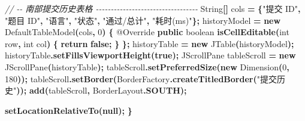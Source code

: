 \documentclass[
  11pt,
]{ctexart}
\newenvironment{Shaded}{\begin{snugshade}}{\end{snugshade}}
\newcommand{\AttributeTok}[1]{\textcolor[rgb]{0.13,0.29,0.53}{#1}}
\newcommand{\BuiltInTok}[1]{#1}
\newcommand{\CommentTok}[1]{\textcolor[rgb]{0.56,0.35,0.01}{\textit{#1}}}
\newcommand{\ControlFlowTok}[1]{\textcolor[rgb]{0.13,0.29,0.53}{\textbf{#1}}}
\newcommand{\DataTypeTok}[1]{\textcolor[rgb]{0.13,0.29,0.53}{#1}}
\newcommand{\DecValTok}[1]{\textcolor[rgb]{0.00,0.00,0.81}{#1}}
\newcommand{\FunctionTok}[1]{\textcolor[rgb]{0.13,0.29,0.53}{\textbf{#1}}}
\newcommand{\KeywordTok}[1]{\textcolor[rgb]{0.13,0.29,0.53}{\textbf{#1}}}
\newcommand{\NormalTok}[1]{#1}
\newcommand{\OperatorTok}[1]{\textcolor[rgb]{0.81,0.36,0.00}{\textbf{#1}}}
\newcommand{\StringTok}[1]{\textcolor[rgb]{0.31,0.60,0.02}{#1}}
\begin{document}
\begin{Shaded}
\begin{Highlighting}[]
        \CommentTok{// {-}{-} 南部提交历史表格 {-}{-}{-}{-}{-}{-}{-}{-}{-}{-}{-}{-}{-}{-}{-}{-}{-}{-}{-}{-}{-}{-}{-}{-}{-}{-}{-}{-}{-}{-}{-}{-}{-}{-}}
        \BuiltInTok{String}\OperatorTok{[]}\NormalTok{ cols }\OperatorTok{=} \OperatorTok{\{}\StringTok{"提交 ID"}\OperatorTok{,} \StringTok{"题目 ID"}\OperatorTok{,} \StringTok{"语言"}\OperatorTok{,} \StringTok{"状态"}\OperatorTok{,} \StringTok{"通过/总计"}\OperatorTok{,} \StringTok{"耗时(ms)"}\OperatorTok{\};}
\NormalTok{        historyModel }\OperatorTok{=} \KeywordTok{new} \BuiltInTok{DefaultTableModel}\OperatorTok{(}\NormalTok{cols}\OperatorTok{,} \DecValTok{0}\OperatorTok{)} \OperatorTok{\{}
            \AttributeTok{@Override}
            \KeywordTok{public} \DataTypeTok{boolean} \FunctionTok{isCellEditable}\OperatorTok{(}\DataTypeTok{int}\NormalTok{ row}\OperatorTok{,} \DataTypeTok{int}\NormalTok{ col}\OperatorTok{)} \OperatorTok{\{}
                \ControlFlowTok{return} \KeywordTok{false}\OperatorTok{;}
            \OperatorTok{\}}
        \OperatorTok{\};}
\NormalTok{        historyTable }\OperatorTok{=} \KeywordTok{new} \BuiltInTok{JTable}\OperatorTok{(}\NormalTok{historyModel}\OperatorTok{);}
\NormalTok{        historyTable}\OperatorTok{.}\FunctionTok{setFillsViewportHeight}\OperatorTok{(}\KeywordTok{true}\OperatorTok{);}
        \BuiltInTok{JScrollPane}\NormalTok{ tableScroll }\OperatorTok{=} \KeywordTok{new} \BuiltInTok{JScrollPane}\OperatorTok{(}\NormalTok{historyTable}\OperatorTok{);}
\NormalTok{        tableScroll}\OperatorTok{.}\FunctionTok{setPreferredSize}\OperatorTok{(}\KeywordTok{new} \BuiltInTok{Dimension}\OperatorTok{(}\DecValTok{0}\OperatorTok{,} \DecValTok{180}\OperatorTok{));}
\NormalTok{        tableScroll}\OperatorTok{.}\FunctionTok{setBorder}\OperatorTok{(}\BuiltInTok{BorderFactory}\OperatorTok{.}\FunctionTok{createTitledBorder}\OperatorTok{(}\StringTok{"提交历史"}\OperatorTok{));}
        \FunctionTok{add}\OperatorTok{(}\NormalTok{tableScroll}\OperatorTok{,} \BuiltInTok{BorderLayout}\OperatorTok{.}\FunctionTok{SOUTH}\OperatorTok{);}

        \FunctionTok{setLocationRelativeTo}\OperatorTok{(}\KeywordTok{null}\OperatorTok{);}
    \OperatorTok{\}}


\end{Highlighting}
\end{Shaded}
\end{document}

